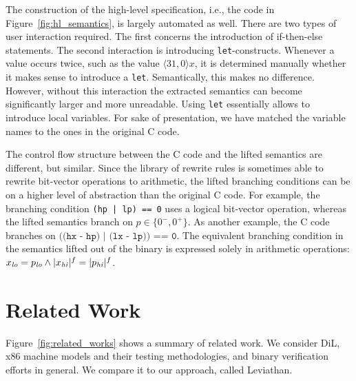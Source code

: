 The construction of the high-level specification, i.e., the code in Figure~\ref{fig:hl_semantics}, is largely automated as well.
There are two types of user interaction required.
The first concerns the introduction of if-then-else statements.
The second interaction is introducing \texttt{let}-constructs.
Whenever a value occurs twice, such as the value $\langle 31,0\rangle x$, it is determined manually whether it makes sense to introduce a \texttt{let}.
Semantically, this makes no difference.
However, without this interaction the extracted semantics can become significantly larger and more unreadable.
Using \texttt{let} essentially allows to introduce local variables.
For sake of presentation, we have matched the variable names to the ones in the original C code.

The control flow structure between the C code and the lifted semantics are different, but similar.
Since the library of rewrite rules is sometimes able to rewrite bit-vector operations to arithmetic, the lifted branching conditions can be on a higher level of abstraction than the original C code.
For example, the branching condition \texttt{(hp | lp) == 0} uses a logical bit-vector operation, whereas the lifted semantics branch on $p \in \{0^-, 0^+\}$.
As another example, the C code branches on $\texttt{((hx - hp) | (lx - lp)) == 0}$.
The equivalent branching condition in the semantics lifted out of the binary is expressed solely in arithmetic operations: $x_{\mathit{lo}} = p_{\mathit{lo}} \wedge |x_{\mathit{hi}}|^f = |p_{\mathit{hi}}|^f$.

\section{Related Work}


Figure~\ref{fig:related_works} shows a summary of related work. 
We consider DiL, x86 machine models and their testing methodologies, and binary verification efforts in general.
We compare it to our approach, called Leviathan.

